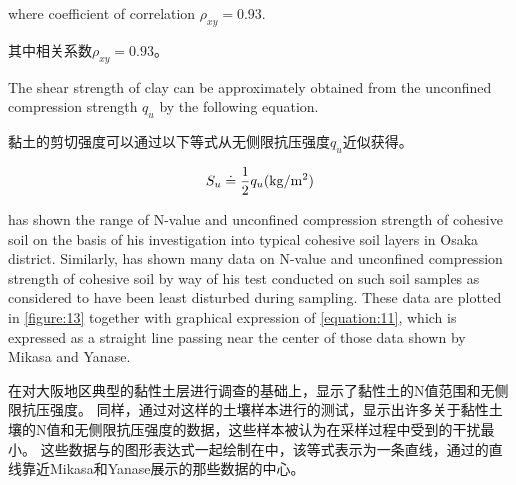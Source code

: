 \begin{paracol}{2}

    \noindent{}where coefficient of correlation $\rho_{xy}=0.93$.

    \switchcolumn      
     
    \noindent{}其中相关系数$\rho_{xy}=0.93$。

\end{paracol}


\begin{paracol}{2}
    

    The shear strength of clay can be approximately obtained from the unconfined compression strength $q_u$ by the following equation.

    \switchcolumn

    黏土的剪切强度可以通过以下等式从无侧限抗压强度$q_u$近似获得。

\end{paracol}

\begin{align}
    S_u\doteq\frac{1}{2}q_u(\rm{kg/m^2})
\end{align}

\begin{paracol}{2}

    \citet{Mikasa197138} has shown the range of N-value and unconfined compression strength of cohesive soil on the basis of his investigation into typical cohesive soil layers in Osaka district. Similarly, \citet{Yanase196937} has shown many data on N-value and unconfined compression strength of cohesive soil by way of his test conducted on such soil samples as considered to have been least disturbed during sampling. These data are plotted in \autoref{figure:13} together with graphical expression of \autoref{equation:11}, which is expressed as a straight line passing near the center of those data shown by Mikasa\citet{Mikasa197138} and Yanase\citet{Yanase196937}.

    \switchcolumn

    \citet{Mikasa197138}在对大阪地区典型的黏性土层进行调查的基础上，显示了黏性土的N值范围和无侧限抗压强度。 同样，\citet{Yanase196937}通过对这样的土壤样本进行的测试，显示出许多关于黏性土壤的N值和无侧限抗压强度的数据，这些样本被认为在采样过程中受到的干扰最小。 这些数据与的图形表达式一起绘制在中，该等式表示为一条直线，通过的直线靠近Mikasa\citet{Mikasa197138}和Yanase\citet{Yanase196937}展示的那些数据的中心。

\end{paracol}